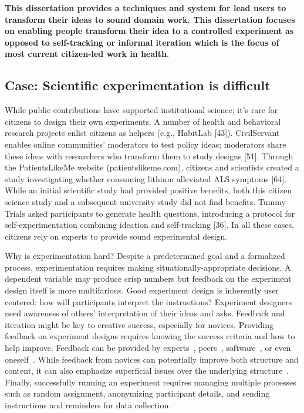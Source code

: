 \textbf{This dissertation provides a techniques and system for lead users to transform their ideas to sound domain work.
This dissertation focuses on enabling people transform their idea to a controlled experiment as opposed to 
self-tracking or informal iteration which is the focus of most current citizen-led work in health}.

\subsection {Case: Scientific experimentation is difficult}
While public contributions have supported institutional science; it’s rare for citizens to design
their own experiments. A number of health and behavioral research projects enlist citizens as helpers (e.g., HabitLab [43]). 
CivilServant enables online communities’ 
moderators to test policy ideas; moderators share these ideas with researchers who transform 
them to study designs [51]. Through the PatientsLikeMe website (patientslikeme.com), citizens 
and scientists created a study investigating whether consuming lithium alleviated ALS symptoms [64]. 
While an initial scientific study had provided positive benefits, both this citizen science study and 
a subsequent university study did not find benefits. Tummy Trials asked 
participants to generate health questions, introducing a protocol for self-experimentation 
combining ideation and self-tracking [36]. In all these cases, citizens rely on experts to provide sound experimental design.

Why is experimentation hard?  Despite a predetermined goal and a formalized process, experimentation
requires making situationally-appropriate decisions. A dependent variable may produce crisp
numbers but feedback on the experiment design itself is more multifarious. Good experiment
design is inherently user centered: how will participants interpret the instructions? Experiment
designers need awareness of others’ interpretation of their ideas and asks. Feedback and iteration
might be key to creative success, especially for novices. Providing feedback on experiment
designs requires knowing the success criteria and how to
help improve.  Feedback can be provided by experts~\cite{dow2012shepherding, schon1984reflective}, peers~\cite{Boud1995, Kulkarni2015b}, software~\cite{Dantoni2015, Head2017}, or even oneself~\cite{Boud1995,schon1984reflective}. While feedback from novices can
potentially improve both structure and content, it can also emphasize superficial issues over the
underlying structure~\cite{chi1981expertise}. Finally, successfully running an experiment
requires managing multiple processes such as random
assignment, anonymizing participant details, and sending
instructions and reminders for data collection.

